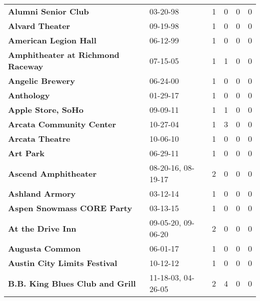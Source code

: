 \begin{supertabular}{p{0.4\textwidth}p{0.3\textwidth}p{0.05\textwidth}p{0.05\textwidth}p{0.05\textwidth}p{0.05\textwidth}}
                                          \textbf{Alumni Senior Club} &            03-20-98 &  1 &  0 &  0 &  0 \\
                                              \textbf{Alvard Theater} &            09-19-98 &  1 &  0 &  0 &  0 \\
                                        \textbf{American Legion Hall} &            06-12-99 &  1 &  0 &  0 &  0 \\
                            \textbf{Amphitheater at Richmond Raceway} &            07-15-05 &  1 &  1 &  0 &  0 \\
                                             \textbf{Angelic Brewery} &            06-24-00 &  1 &  0 &  0 &  0 \\
                                                   \textbf{Anthology} &            01-29-17 &  1 &  0 &  0 &  0 \\
                                           \textbf{Apple Store, SoHo} &            09-09-11 &  1 &  1 &  0 &  0 \\
                                     \textbf{Arcata Community Center} &            10-27-04 &  1 &  3 &  0 &  0 \\
                                              \textbf{Arcata Theatre} &            10-06-10 &  1 &  0 &  0 &  0 \\
                                                    \textbf{Art Park} &            06-29-11 &  1 &  0 &  0 &  0 \\
                                         \textbf{Ascend Amphitheater} &  08-20-16, 08-19-17 &  2 &  0 &  0 &  0 \\
                                              \textbf{Ashland Armory} &            03-12-14 &  1 &  0 &  0 &  0 \\
                                   \textbf{Aspen Snowmass CORE Party} &            03-13-15 &  1 &  0 &  0 &  0 \\
                                            \textbf{At the Drive Inn} &  09-05-20, 09-06-20 &  2 &  0 &  0 &  0 \\
                                              \textbf{Augusta Common} &            06-01-17 &  1 &  0 &  0 &  0 \\
                                 \textbf{Austin City Limits Festival} &            10-12-12 &  1 &  0 &  0 &  0 \\
                              \textbf{B.B. King Blues Club and Grill} &  11-18-03, 04-26-05 &  2 &  4 &  0 &  0 \\

\end{supertabular}
